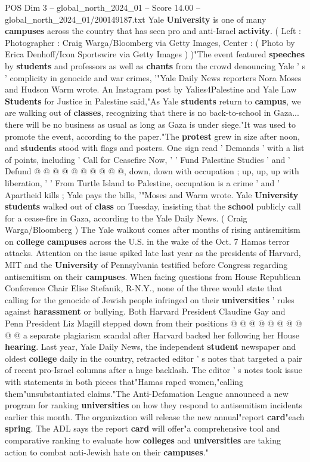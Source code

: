\begin{textsample}{POS Dim 3 – global\_north\_2024\_01 – Score 14.00 – global\_north\_2024\_01/200149187.txt}  \label{ex:f3_pos_243}
Yale \textbf{University} is one of many \textbf{campuses} across the country that has seen pro and anti-Israel \textbf{activity}. ( Left : Photographer : Craig Warga/Bloomberg via Getty Images, Center : ( Photo by Erica Denhoff/Icon Sportswire via Getty Images ) )"The event featured \textbf{speeches} by \textbf{students} and professors as well as \textbf{chants} from the crowd denouncing Yale ' s ' complicity in genocide and war crimes, '"Yale Daily News reporters Nora Moses and Hudson Warm wrote.
An Instagram post by Yalies4Palestine and Yale Law \textbf{Students} for Justice in Palestine said,"As Yale \textbf{students} return to \textbf{campus}, we are walking out of \textbf{classes}, recognizing that there is no back-to-school in Gaza... there will be no business as usual as long as Gaza is under siege."It was used to promote the event, according to the paper."The \textbf{protest} grew in size after noon, and \textbf{students} stood with flags and posters.
One sign read ' Demands ' with a list of points, including ' Call for Ceasefire Now, ' ' Fund Palestine Studies ' and ' Defund @ @ @ @ @ @ @ @ @ @, down, down with occupation ; up, up, up with liberation, ' ' From Turtle Island to Palestine, occupation is a crime ' and ' Apartheid kills ; Yale pays the bills, '"Moses and Warm wrote.
Yale \textbf{University} \textbf{students} walked out of \textbf{class} on Tuesday, insisting that the \textbf{school} publicly call for a cease-fire in Gaza, according to the Yale Daily News. ( Craig Warga/Bloomberg ) The Yale walkout comes after months of rising antisemitism on \textbf{college} \textbf{campuses} across the U.S. in the wake of the Oct. 7 Hamas terror attacks.
Attention on the issue spiked late last year as the presidents of Harvard, MIT and the \textbf{University} of Pennsylvania testified before Congress regarding antisemitism on their \textbf{campuses}.
When facing questions from House Republican Conference Chair Elise Stefanik, R-N.Y., none of the three would state that calling for the genocide of Jewish people infringed on their \textbf{universities} ' rules against \textbf{harassment} or bullying.
Both Harvard President Claudine Gay and Penn President Liz Magill stepped down from their positions @ @ @ @ @ @ @ @ @ @ a separate plagiarism scandal after Harvard backed her following her House \textbf{hearing}.
Last year, Yale Daily News, the independent \textbf{student} newspaper and oldest \textbf{college} daily in the country, retracted editor ' s notes that targeted a pair of recent pro-Israel columns after a huge backlash.
The editor ' s notes took issue with statements in both pieces that"Hamas raped women,"calling them"unsubstantiated claims."The Anti-Defamation League announced a new program for ranking \textbf{universities} on how they respond to antisemitism incidents earlier this month.
The organization will release the new annual"report \textbf{card}"each \textbf{spring}.
The ADL says the report \textbf{card} will offer"a comprehensive tool and comparative ranking to evaluate how \textbf{colleges} and \textbf{universities} are taking action to combat anti-Jewish hate on their \textbf{campuses}."


\end{textsample}
